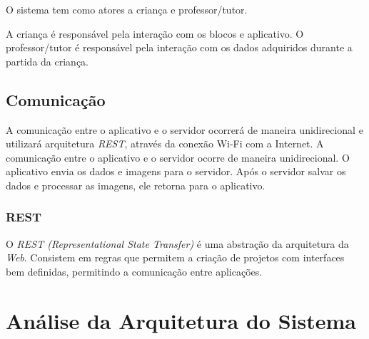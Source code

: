     O sistema tem como atores a criança e professor/tutor.
    
    A criança é responsável pela interação com os blocos e aplicativo.
    O professor/tutor é responsável pela interação com os dados adquiridos durante a partida da criança.
    
    \subsection{Comunicação}
    A comunicação entre o aplicativo e o servidor ocorrerá de maneira unidirecional e utilizará arquitetura \textit{REST}, através da conexão Wi-Fi com a Internet.
    A comunicação entre o aplicativo e o servidor ocorre de maneira unidirecional. 
    O aplicativo envia os dados e imagens para o servidor. Após o servidor salvar os dados e processar as imagens, ele retorna para o aplicativo.
    
    \subsubsection{REST}
    O \textit{REST (Representational State Transfer)} é uma abstração da arquitetura da \textit{Web}. Consistem em regras que permitem a criação de projetos com interfaces bem definidas, permitindo a comunicação entre aplicações.
    
    
    
    
    


\section{Análise da Arquitetura do Sistema}

